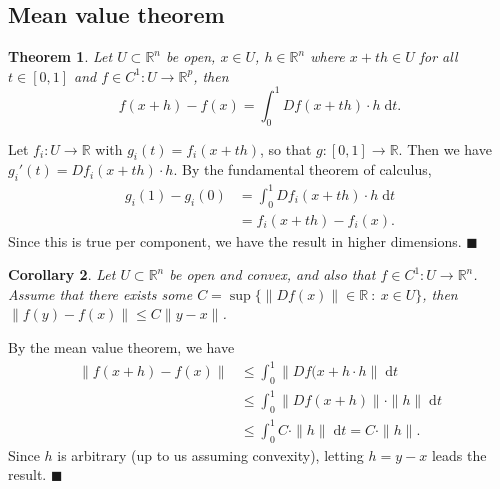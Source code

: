 \documentclass[letter-paper]{tufte-book}
\newtheorem{theorem}{\color{pastel-blue}Theorem}[section]
\newtheorem{corollary}[theorem]{\color{pastel-blue}Corollary}
\newenvironment{proof}[1][Proof]{\begin{trivlist}
\item[\hskip \labelsep {\bfseries #1}]}{\end{trivlist}}
\newcommand{\qed}{\hfill$\blacksquare$}
\begin{document}

\subsection{Mean value theorem}

\begin{theorem}
  Let $U \subset \mathbb{R}^n$ be open, $x \in U$, $h \in \mathbb{R}^n$ where $x
  + th \in U$ for all $t \in [0, 1]$ and $f \in C^1 : U \to \mathbb{R}^p$, then
  \begin{equation*}
    f(x + h) - f(x) = \int^1_0 Df(x + th)\cdot h\; \mathrm{d}t.
  \end{equation*}
\end{theorem}

\begin{proof}
  Let $f_i : U \to \mathbb{R}$ with $g_i(t) = f_i(x + th)$, so that $g : [0, 1]
  \to \mathbb{R}$. Then we have $g_i'(t) = Df_i(x + th) \cdot h$. By the
  fundamental theorem of calculus,
  \begin{align*}
    g_i(1) - g_i(0) &= \int_0^1 Df_i(x + th) \cdot h\; \mathrm{d}t \\
      &= f_i(x + th) - f_i(x).
  \end{align*}
  Since this is true per component, we have the result in higher dimensions. \qed
\end{proof}

\begin{corollary}
  Let $U \subset \mathbb{R}^n$ be open and convex, and also that $f \in C^1 : U \to
  \mathbb{R}^n$. Assume that there exists some $C = \sup \{\|Df(x)\| \in
  \mathbb{R}\ :\ x \in U\}$, then $\|f(y) - f(x)\| \leq C\|y - x\|$.
\end{corollary}

\begin{proof}
  By the mean value theorem, we have
  \begin{align*}
    \|f(x + h) - f(x)\| &\leq \int_0^1 \|Df(x + h \cdot h\|\; \mathrm{d}t\\
      &\leq \int_0^1 \|Df(x + h)\| \cdot \|h\|\; \mathrm{d}t\\
      &\leq \int_0^1 C \cdot \|h\|\; \mathrm{d}t = C \cdot \|h\|.
  \end{align*}
  Since $h$ is arbitrary (up to us assuming convexity), letting $h = y - x$
  leads the result. \qed
\end{proof}
\end{document}

